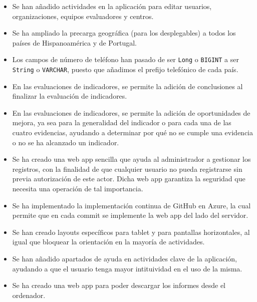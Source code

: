 \begin{itemize}
\begin{lstlisting}
    \end{lstlisting}
    \item Se han añadido actividades en la aplicación para editar usuarios, organizaciones, equipos evaluadores y centros.
    \item Se ha ampliado la precarga geográfica (para los desplegables) a todos los países de Hispanoamérica y de Portugal.
    \item Los campos de número de teléfono han pasado de ser \texttt{Long} o
    \texttt{BIGINT} a ser \texttt{String} o \texttt{VARCHAR}, puesto que añadimos el prefijo telefónico de cada país.
    \item En las evaluaciones de indicadores, se permite la adición de conclusiones al finalizar la evaluación de indicadores.
    \item En las evaluaciones de indicadores, se permite la adición de
    oportunidades de mejora, ya sea para la generalidad del indicador o para
    cada una de las cuatro evidencias, ayudando a determinar por qué no se
    cumple una evidencia o no se ha alcanzado un indicador.
    \item Se ha creado una web app sencilla que ayuda al administrador a
    gestionar los registros, con la finalidad de que cualquier usuario no pueda
    registrarse sin previa autorización de este actor. Dicha web
    app\cite{guiaoteaadminHerramientaAdministracixF3n} garantiza la seguridad
    que necesita una operación de tal importancia.
    \item Se ha implementado la implementación continua de GitHub en Azure, la
    cual permite que en cada commit se implemente la web app del lado del
    servidor.
    \item Se han creado layouts específicos para tablet y para pantallas
    horizontales, al igual que bloquear la orientación en la mayoría de
    actividades.
    \item Se han añadido apartados de ayuda en actividades clave de la
    aplicación, ayudando a que el usuario tenga mayor intituividad en el uso de
    la misma.
    \item Se ha creado una web app para poder descargar los informes desde el
    ordenador.\cite{guiaoteainformesHerramientaDescarga}
\end{itemize}

